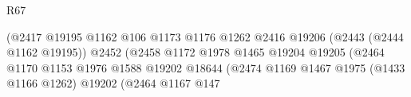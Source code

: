 \begin{lexlean}{R67}
\begin{coremodule}
                                                                    (@2417
                                                                      @19195
                                                                      @1162
                                                                      @106
                                                                      @1173
                                                                      @1176
                                                                      @1262
                                                                      @2416
                                                                      @19206
                                                                      (@2443 (@2444 @1162 @19195))
                                                                      @2452
                                                                      (@2458
                                                                        @1172
                                                                        @1978
                                                                        @1465
                                                                        @19204
                                                                        @19205
                                                                        (@2464
                                                                          @1170
                                                                          @1153
                                                                          @1976
                                                                          @1588
                                                                          @19202
                                                                          @18644
                                                                          (@2474
                                                                            @1169
                                                                            @1467
                                                                            @1975
                                                                            (@1433 @1166 @1262)
                                                                            @19202
                                                                            (@2464
                                                                              @1167
                                                                              @147

\end{coremodule}
\end{lexlean}
